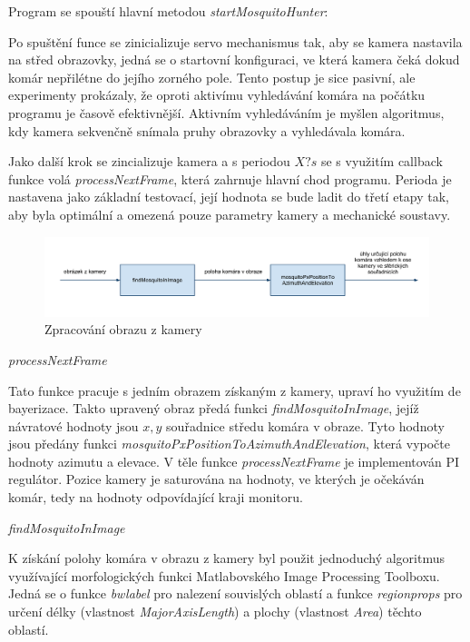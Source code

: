 \documentclass[a4paper,10pt]{article}
\begin{document}
Program se spouští hlavní metodou \textit{startMosquitoHunter}:

Po spuštění funce se zinicializuje servo mechanismus tak, aby se kamera nastavila na střed obrazovky, jedná se o startovní konfiguraci, ve která kamera čeká dokud komár nepřilétne do jejího zorného pole. Tento postup je sice pasivní, ale experimenty prokázaly, že oproti aktivímu vyhledávání komára na počátku programu je časově efektivnější. Aktivním vyhledáváním je myšlen algoritmus, kdy kamera sekvenčně snímala pruhy obrazovky a vyhledávala komára.

Jako další krok se zincializuje kamera a s periodou $X? s$ se s využitím callback funkce volá \textit{processNextFrame}, která zahrnuje hlavní chod programu. Perioda je nastavena jako základní testovací, její hodnota se bude ladit do třetí etapy tak, aby byla optimální a omezená pouze parametry kamery a mechanické soustavy. 

\begin{figure}[!h]
    \centering
     \includegraphics[width=1\columnwidth]{pics/zpracovani_obrazu_z_kamery}
     \caption{Zpracování obrazu z kamery\label{fig:rid_system}}
\end{figure}


\vspace{0.5cm}
\textit{processNextFrame}

Tato funkce pracuje s jedním obrazem získaným z kamery, upraví ho využitím de bayerizace. Takto upravený obraz předá funkci \textit{findMosquitoInImage}, jejíž návratové hodnoty jsou $x, y$ souřadnice středu komára v obraze. Tyto hodnoty jsou předány funkci \textit{mosquitoPxPositionToAzimuthAndElevation}, která vypočte hodnoty azimutu a elevace. V těle funkce \textit{processNextFrame} je implementován PI regulátor. Pozice kamery je saturována na hodnoty, ve kterých je očekáván komár, tedy na hodnoty odpovídající kraji monitoru. 

\vspace{0.5cm}
\textit{findMosquitoInImage}

K získání polohy komára v obrazu z kamery byl použit jednoduchý algoritmus využívající morfologických funkci Matlabovského Image Processing Toolboxu. Jedná se o funkce \textit{bwlabel} pro nalezení souvislých oblastí a funkce \textit{regionprops} pro určení délky (vlastnost \textit{MajorAxisLength}) a plochy (vlastnost \textit{Area}) těchto oblastí.
\end{document}
